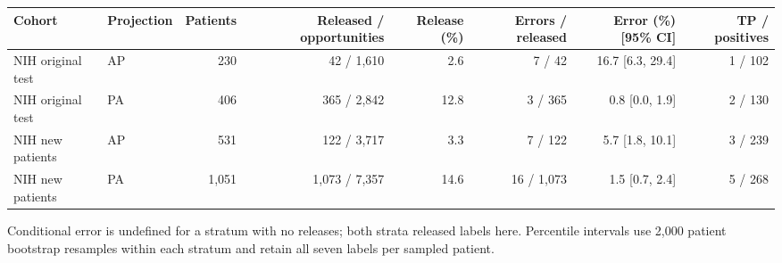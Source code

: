 \begin{tabular}{llrrrrrr}
\toprule
Cohort & Projection & Patients & Released / opportunities & Release (\%) & Errors / released & Error (\%) [95\% CI] & TP / positives\\
\midrule
NIH original test & AP & 230 & 42 / 1,610 & 2.6 & 7 / 42 & 16.7 [6.3, 29.4] & 1 / 102\\
NIH original test & PA & 406 & 365 / 2,842 & 12.8 & 3 / 365 & 0.8 [0.0, 1.9] & 2 / 130\\
NIH new patients & AP & 531 & 122 / 3,717 & 3.3 & 7 / 122 & 5.7 [1.8, 10.1] & 3 / 239\\
NIH new patients & PA & 1,051 & 1,073 / 7,357 & 14.6 & 16 / 1,073 & 1.5 [0.7, 2.4] & 5 / 268\\
\bottomrule
\end{tabular}\par\vspace{3pt}
\noindent\footnotesize Conditional error is undefined for a stratum with no releases; both strata released labels here. Percentile intervals use 2,000 patient bootstrap resamples within each stratum and retain all seven labels per sampled patient.
